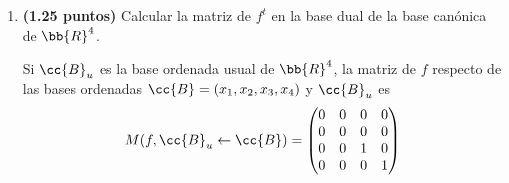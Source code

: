 \documentclass[12pt]{article}
\begin{document}
\begin{ejercicio}[2.5 puntos]
\begin{enumerate}
            \item \textbf{(1.25 puntos)} Calcular la matriz de $f^t$ en la base dual de la base canónica de $\bb{R}^4$.
            
            Si $\cc{B}_u$ es la base ordenada usual de $\bb{R}^4$, la matriz de $f$ respecto de las bases ordenadas $\cc{B} = (x_1, x_2, x_3, x_4)$ y $\cc{B}_u$ es 
            \begin{gather} \label{eq_4}
                M(f, \cc{B}_u \leftarrow \cc{B}) = 
                \begin{pmatrix}
                    0 & 0 & 0 & 0 \\
                    0 & 0 & 0 & 0 \\
                    0 & 0 & 1 & 0 \\
                    0 & 0 & 0 & 1 \\
                \end{pmatrix}
            \end{gather}


\end{enumerate}
\end{ejercicio}
\end{document}
